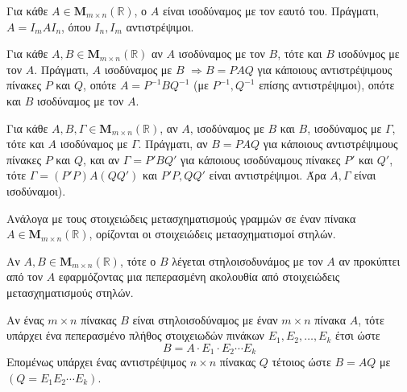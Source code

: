 \begin{rem}
\item {}
  \begin{myitemize}
    \item Για κάθε $ A \in \textbf{M}_{m \times n}(\mathbb{R}) $, ο $A$ είναι ισοδύναμος 
      με τον εαυτό του. Πράγματι, $ A = I_{m}AI_{n} $, όπου $ I_{n}, I_{m} $ 
      αντιστρέψιμοι.
    \item Για κάθε $ A,B \in \textbf{M}_{m \times n}(\mathbb{R}) $ αν $ A $ ισοδύναμος με
      τον $B$, τότε και $B$ ισοδύνμος με τον $A$. Πράγματι, $A$ ισοδύναμος με $B$ $
      \Rightarrow B=PAQ $ για κάποιους αντιστρέψιμους πίνακες $ P $ και $Q$, οπότε 
      $ A=P^{-1}BQ^{-1} $ (με $ P^{-1}, Q^{-1} $ επίσης αντιστρέψιμοι), οπότε και 
      $B$ ισοδύναμος με τον $A$.
    \item Για κάθε $ A,B, \Gamma \in \textbf{M}_{m \times n}(\mathbb{R}) $, αν $ A $, 
      ισοδύναμος με $ B $ και $ B $, ισοδύναμος με $\Gamma $, τότε και $ A$ ισοδύναμος
      με $ \Gamma $. Πράγματι, αν $ B=PAQ $ για κάποιους αντιστρέψιμους πίνακες 
      $ P $ και $ Q $, και αν $ \Gamma = P'BQ' $ για κάποιους ισοδύναμους πίνακες 
      $ P' $ και $ Q' $, τότε $ \Gamma = (P'P)A(QQ') $ και $ P'P, QQ'$ είναι
      αντιστρέψιμοι. Άρα $ A,\Gamma $ είναι ισοδύναμοι).
  \end{myitemize}
\end{rem}

\begin{rem}
  Ανάλογα με τους στοιχειώδεις μετασχηματισμούς γραμμών σε έναν πίνακα $ A \in
  \textbf{M}_{m \times n}(\mathbb{R}) $, ορίζονται οι στοιχειώδεις μετασχηματισμοί 
  στηλών.
\end{rem}

\begin{dfn}
  Αν $ A, B \in \textbf{M}_{m \times n}(\mathbb{R}) $, τότε ο $B$ λέγεται στηλοισοδυνάμος
  με τον $A$ αν προκύπτει από τον $A$ εφαρμόζοντας μια πεπερασμένη ακολουθία από 
  στοιχειώδεις μετασχηματισμούς στηλών.
\end{dfn}

\begin{thm}
  Αν ένας $ m \times n $ πίνακας $ B $ είναι στηλοισοδύναμος με έναν $ m \times n $ 
  πίνακα $A$, τότε υπάρχει ένα πεπερασμένο πλήθος στοιχειωδών πινάκων $ E_{1}, E_{2},
  \ldots, E_{k} $ έτσι ώστε 
  \[
    B = A \cdot E_{1} \cdot E_{2} \cdots E_{k} 
  \] 
  Επομένως υπάρχει ένας αντιστρέψιμος $ n \times n $ πίνακας $ Q $ τέτοιος ώστε 
  $ B=AQ $ με $ (Q=E_{1}E_{2}\cdots E_{k}) $.
\end{thm}

